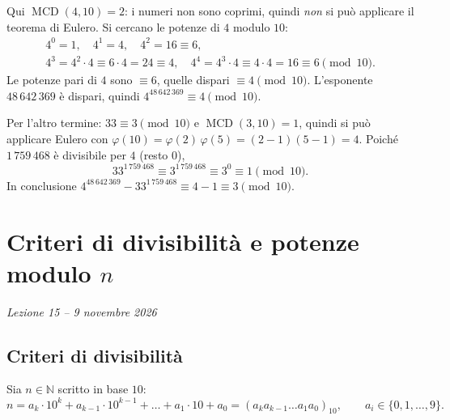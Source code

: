 \documentclass[11pt,a4paper]{article}
\begin{document}
\begin{esempio}[$4^{48\,642\,369} - 33^{1\,759\,468} \bmod 10$]
Qui $\operatorname{MCD}(4, 10) = 2$: i numeri non sono coprimi, quindi \emph{non} si può applicare il teorema di Eulero. Si cercano le potenze di $4$ modulo $10$:
\[
  \begin{gathered}
  4^0 = 1,\quad 4^1 = 4,\quad 4^2 = 16 \equiv 6,\\
  4^3 = 4^2\cdot 4 \equiv 6\cdot 4 = 24 \equiv 4,\quad 4^4 = 4^3\cdot 4 \equiv 4\cdot 4 = 16 \equiv 6 \pmod{10}.
  \end{gathered}
\]
Le potenze pari di $4$ sono $\equiv 6$, quelle dispari $\equiv 4 \pmod{10}$. L'esponente $48\,642\,369$ è dispari, quindi $4^{48\,642\,369} \equiv 4 \pmod{10}$.

Per l'altro termine: $33 \equiv 3 \pmod{10}$ e $\operatorname{MCD}(3, 10) = 1$, quindi si può applicare Eulero con $\varphi(10) = \varphi(2)\,\varphi(5) = (2 - 1)(5 - 1) = 4$. Poiché $1\,759\,468$ è divisibile per $4$ (resto $0$),
\[
  33^{1\,759\,468} \equiv 3^{1\,759\,468} \equiv 3^0 \equiv 1 \pmod{10}.
\]
In conclusione $4^{48\,642\,369} - 33^{1\,759\,468} \equiv 4 - 1 \equiv 3 \pmod{10}$.
\end{esempio}

\section[Criteri di divisibilità e potenze modulo $n$ (Lezione 15 -- 9 novembre 2026)]{Criteri di divisibilità e potenze modulo $n$}
\noindent\emph{Lezione 15 -- 9 novembre 2026}

\subsection{Criteri di divisibilità}

Sia $n \in \mathbb{N}$ scritto in base $10$:
\[
  n = a_k\cdot 10^k + a_{k-1}\cdot 10^{k-1} + \dots + a_1\cdot 10 + a_0 = (a_k a_{k-1}\dots a_1 a_0)_{10}, \qquad a_i \in \{0, 1, \dots, 9\}.
\]
\end{document}

